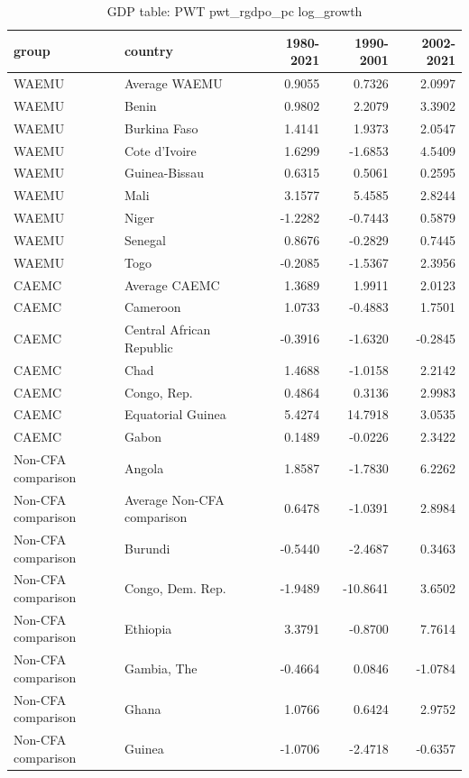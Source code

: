 \begin{table}

\caption{GDP table: PWT pwt_rgdpo_pc log_growth}
\centering
\begin{tabular}[t]{llrrr}
\toprule
group & country & 1980-2021 & 1990-2001 & 2002-2021\\
\midrule
WAEMU & Average WAEMU & 0.9055 & 0.7326 & 2.0997\\
WAEMU & Benin & 0.9802 & 2.2079 & 3.3902\\
WAEMU & Burkina Faso & 1.4141 & 1.9373 & 2.0547\\
WAEMU & Cote d'Ivoire & 1.6299 & -1.6853 & 4.5409\\
WAEMU & Guinea-Bissau & 0.6315 & 0.5061 & 0.2595\\
\addlinespace
WAEMU & Mali & 3.1577 & 5.4585 & 2.8244\\
WAEMU & Niger & -1.2282 & -0.7443 & 0.5879\\
WAEMU & Senegal & 0.8676 & -0.2829 & 0.7445\\
WAEMU & Togo & -0.2085 & -1.5367 & 2.3956\\
CAEMC & Average CAEMC & 1.3689 & 1.9911 & 2.0123\\
\addlinespace
CAEMC & Cameroon & 1.0733 & -0.4883 & 1.7501\\
CAEMC & Central African Republic & -0.3916 & -1.6320 & -0.2845\\
CAEMC & Chad & 1.4688 & -1.0158 & 2.2142\\
CAEMC & Congo, Rep. & 0.4864 & 0.3136 & 2.9983\\
CAEMC & Equatorial Guinea & 5.4274 & 14.7918 & 3.0535\\
\addlinespace
CAEMC & Gabon & 0.1489 & -0.0226 & 2.3422\\
Non-CFA comparison & Angola & 1.8587 & -1.7830 & 6.2262\\
Non-CFA comparison & Average Non-CFA comparison & 0.6478 & -1.0391 & 2.8984\\
Non-CFA comparison & Burundi & -0.5440 & -2.4687 & 0.3463\\
Non-CFA comparison & Congo, Dem. Rep. & -1.9489 & -10.8641 & 3.6502\\
\addlinespace
Non-CFA comparison & Ethiopia & 3.3791 & -0.8700 & 7.7614\\
Non-CFA comparison & Gambia, The & -0.4664 & 0.0846 & -1.0784\\
Non-CFA comparison & Ghana & 1.0766 & 0.6424 & 2.9752\\
Non-CFA comparison & Guinea & -1.0706 & -2.4718 & -0.6357\\

\end{tabular}
\end{table}
